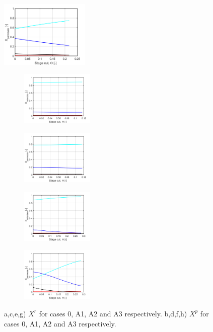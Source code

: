 \begin{figure}[H]
	\begin{subfigure}[]
		\centering
	\end{subfigure}	
		\includegraphics[width = 0.38\textwidth]{Images/case_A1_permeate.png}
	\begin{subfigure}[]
		\centering
		\includegraphics[width = 0.38\textwidth]{Images/case_A2_retenate.png}
	\end{subfigure}
	\begin{subfigure}[]
		\centering
		\includegraphics[width = 0.38\textwidth]{Images/case_A2_permeate.png}
	\end{subfigure}
	\begin{subfigure}[]
		\centering
		\includegraphics[width = 0.38\textwidth]{Images/case_A3_retenate.png}
	\end{subfigure}
	\begin{subfigure}[]
		\centering
		\includegraphics[width = 0.38\textwidth]{Images/case_A3_permeate.png}
	\end{subfigure}	
\caption{a,c,e,g) $X^r$ for cases 0, A1, A2 and A3 respectively. \newline b,d,f,h) $X^p$ for cases 0, A1, A2 and A3 respectively.}	
\label{fig:fig7}
\end{figure}

